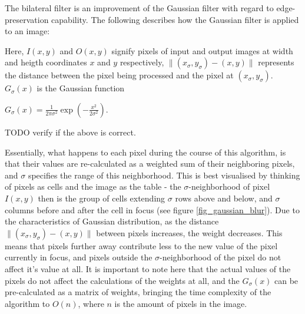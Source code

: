 \documentclass [12pt,a4paper]{report}
\begin{document}
The bilateral filter is an improvement of the Gaussian filter with regard to edge-preservation capability. The following describes how the Gaussian filter is applied to an image:

\begin{center}
\begin{algorithm}[h]
\end{algorithm}
\end{center}

Here, $I(x,y)$ and $O(x,y)$ signify pixels of input and output images at width and heigth coordinates $x$ and $y$ respectively, $\| (x_\sigma, y_\sigma)-(x, y) \|$ represents the distance between the pixel being processed and the pixel at $(x_\sigma, y_\sigma)$. $G_\sigma(x)$ is the Gaussian function

\begin{center}
$G_\sigma(x) = \frac{1}{2\pi\sigma^2} \exp(-\frac{x^2}{2\sigma^2})$.
\end{center}

TODO verify if the above is correct.

Essentially, what happens to each pixel during the course of this algorithm, is that their values are re-calculated as a weighted sum of their neighboring pixels, and $\sigma$ specifies the range of this neighborhood. This is best visualised by thinking of pixels as cells and the image as the table - the $\sigma$-neighborhood of pixel $I(x,y)$ then is the group of cells extending $\sigma$ rows above and below, and $\sigma$ columns before and after the cell in focus (see figure \ref{fig_gaussian_blur}). Due to the characteristics of Gaussian distribution, as the distance $\| (x_\sigma, y_\sigma)-(x, y) \|$ between pixels increases, the weight decreases. This means that pixels further away contribute less to the new value of the pixel currently in focus, and pixels outside the $\sigma$-neighborhood of the pixel do not affect it's value at all. It is important to note here that the actual values of the pixels do not affect the calculations of the weights at all, and the $G_\sigma(x)$ can be pre-calculated as a matrix of weights, bringing the time complexity of the algorithm to $O(n)$, where $n$ is the amount of pixels in the image.
\end{document}
